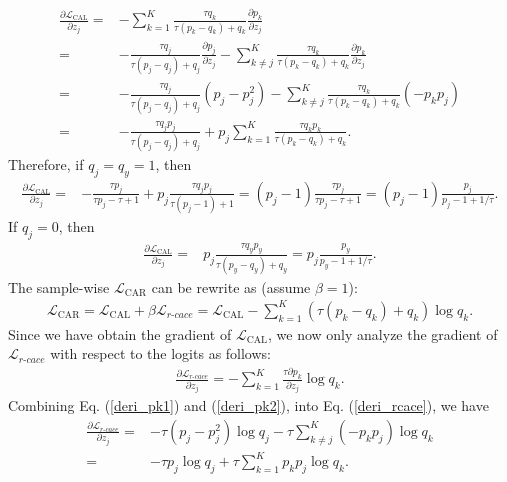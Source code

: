 \documentclass{article}
\begin{document}
\begin{align}
	\frac{\partial \mathcal{L}_{\textrm{CAL}}}{\partial z_{j}}=&-\sum_{k=1}^{K}\frac{\tau q_{k}}{\tau (p_{k}-q_{k})+q_{k}}\frac{\partial p_{k}}{\partial z_{j}}\nonumber\\=&-\frac{\tau q_{j}}{\tau (p_{j}-q_{j})+q_{j}}\frac{\partial p_{j}}{\partial z_{j}}-\sum_{k\ne j}^{K}\frac{\tau q_{k}}{\tau (p_{k}-q_{k})+q_{k}}\frac{\partial p_{k}}{\partial z_{j}} \nonumber \\ =&-\frac{\tau q_{j}}{\tau (p_{j}-q_{j})+q_{j}}(p_{j}-p_{j}^2)-\sum_{k\ne j}^{K}\frac{\tau q_{k}}{\tau (p_{k}-q_{k})+q_{k}}(-p_{k}p_{j}) \nonumber \\=&-\frac{\tau q_{j}p_{j}}{\tau(p_{j}-q_{j})+q_{j}}+p_{j}\sum_{k=1}^{K}\frac{\tau q_{k}p_{k}}{\tau(p_{k}-q_{k})+q_{k}}.
\end{align}
Therefore, if $q_{j}=q_{y}=1$, then
\begin{align}
	\frac{\partial \mathcal{L}_{\textrm{CAL}}}{\partial z_{j}}=&-\frac{\tau p_{j}}{\tau p_{j} - \tau +1}+p_{j}\frac{\tau q_{j}p_{j}}{\tau(p_{j}-1)+1} =(p_{j}-1) \frac{\tau p_{j}}{\tau p_{j}-\tau +1}= (p_{j}-1) \frac{ p_{j}}{p_{j}-1 +1/\tau}. 
\end{align}
If $q_{j}=0$, then 
\begin{align}
	\frac{\partial \mathcal{L}_{\textrm{CAL}}}{\partial z_{j}}=&p_{j}\frac{\tau q_{y}p_{y}}{\tau (p_{y}-q_{y})+q_{y}} = p_{j} \frac{p_{y}}{p_{y}-1+1/\tau}. 
\end{align}
The sample-wise $\mathcal{L}_\textrm{CAR}$ can be rewrite as (assume $\beta=1$):
\begin{align}
	\mathcal{L}_\textrm{CAR}=\mathcal{L}_\textrm{CAL} + \beta\mathcal{L}_{r\textrm{-}cace} = \mathcal{L}_\textrm{CAL} - \sum_{k=1}^{K} (\tau (p_{k}-q_{k})+q_{k}) \log q_{k}. 
\end{align}
Since we have obtain the gradient of $\mathcal{L}_\textrm{CAL}$, we now only analyze the gradient of $\mathcal{L}_{r\textrm{-}cace}$ with respect to the logits as follows:
\begin{align}
	\label{deri_rcace}
	\frac{\partial \mathcal{L}_{r\textrm{-}cace}}{\partial z_{j}}=-\sum_{k=1}^{K}\frac{\tau \partial p_{k} }{\partial z_{j}}\log q_{k}.
\end{align}
Combining Eq. (\ref{deri_pk1}) and (\ref{deri_pk2}), into Eq. (\ref{deri_rcace}), we have 
\begin{align}
	\frac{\partial \mathcal{L}_{r\textrm{-}cace}}{\partial z_{j}}=&-\tau (p_{j}-p_{j}^{2})\log q_{j} -\tau\sum_{k\ne j}^{K}(-p_{k}p_{j})\log q_{k} \nonumber \\
	=&-\tau p_{j}\log q_{j}+\tau\sum_{k=1}^{K}p_{k}p_{j}\log q_{k}.
\end{align}
\end{document}

